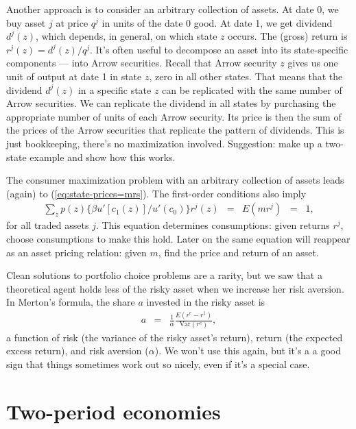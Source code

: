 \documentclass[11pt]{article}
\begin{document}
Another approach is to consider an arbitrary collection of assets.
At date 0, we buy asset $j$ at price $q^j$ in units of the date 0 good.
At date 1, we get dividend $d^j(z)$, which depends, in general,
on which state $z$ occurs.
The (gross) return is $r^j(z) = d^j(z)/q^j$.
It's often useful to decompose an asset into its state-specific components ---
into Arrow securities.
Recall that Arrow security $z$ gives us one unit of output at date 1 in state $z$,
zero in all other states.
That means that the dividend $d^j(z)$ in a specific state $z$ can be replicated with the same number
of Arrow securities.
We can replicate the dividend in all states by purchasing the appropriate number of units
of each Arrow security.
Its price is then the sum of the prices of the Arrow securities that replicate the
pattern of dividends.
This is just bookkeeping, there's no maximization involved.
Suggestion:  make up a two-state example and show how this works.


The consumer maximization problem with an arbitrary  collection of assets
leads (again) to (\ref{eq:state-prices=mrs}).
The first-order conditions also imply
\begin{eqnarray}
    \sum_z p(z) \{ \beta u'[c_1(z)]/u'(c_0) \} r^j(z) &=&
        E(m r^j) \;\;=\;\; 1 ,
        \label{eq:Emr}
\end{eqnarray}
for all traded assets $j$.
This equation determines consumptions:  given returns $r^j$, choose consumptions to make this hold.
Later on the same equation will reappear as an asset pricing relation:
given $m$, find the price and return of an asset.


Clean solutions to portfolio choice problems are a rarity, but we saw that a theoretical agent
holds less of the risky asset when we increase her risk aversion.
In Merton's formula, the share $a$ invested in the risky asset is
\begin{eqnarray*}
    a &=& \frac{1}{\alpha} \frac{E (r^e - r^1)}{\mbox{Var}(r^e)} ,
\end{eqnarray*}
a function of risk (the variance of the risky asset's return),
return (the expected excess return), and risk aversion ($\alpha$).
We won't use this again, but it's a a good sign that things sometimes work
out so nicely, even if it's a special case.



\section*{Two-period economies}
\end{document}
